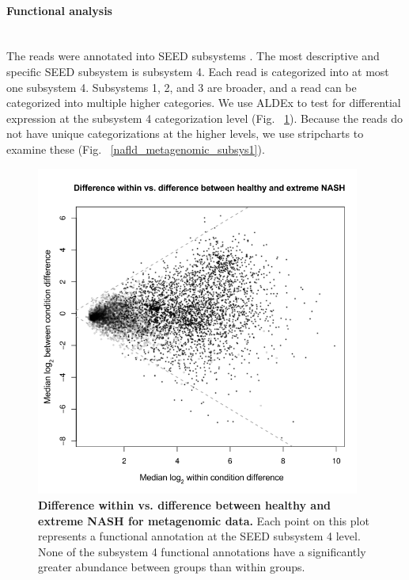 \paragraph{Functional analysis}\mbox{}\\
The reads were annotated into SEED subsystems \cite{overbeek2005subsystems}. The most descriptive and specific SEED subsystem is subsystem 4. Each read is categorized into at most one subsystem 4. Subsystems 1, 2, and 3 are broader, and a read can be categorized into multiple higher categories. We use ALDEx to test for differential expression at the subsystem 4 categorization level (Fig. ~\ref{nafld_metagenomic_aldex}). Because the reads do not have unique categorizations at the higher levels, we use stripcharts to examine these (Fig. ~\ref{nafld_metagenomic_subsys1}).

\begin{figure}[h]
\begin{center}
\includegraphics[width=0.95\textwidth]{metagenomic_aldex.png}
\caption[Difference within vs. difference between healthy and extreme NASH for metagenomic data.]{\textbf{Difference within vs. difference between healthy and extreme NASH for metagenomic data.} Each point on this plot represents a functional annotation at the SEED subsystem 4 level. None of the subsystem 4 functional annotations have a significantly greater abundance between groups than within groups.}
\label{nafld_metagenomic_aldex}
\end{center}
\end{figure}

